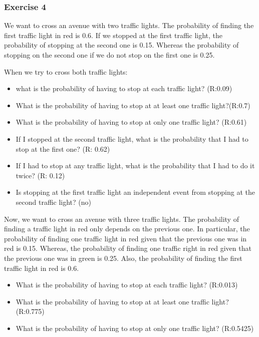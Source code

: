 \documentclass[
]{book}
\providecommand{\tightlist}{%
  \setlength{\itemsep}{0pt}\setlength{\parskip}{0pt}}
\begin{document}
\hypertarget{exercise-4}{%
\subsubsection{Exercise 4}\label{exercise-4}}

We want to cross an avenue with two traffic lights. The probability of finding the first traffic light in red is 0.6. If we stopped at the first traffic light, the probability of stopping at the second one is 0.15. Whereas the probability of stopping on the second one if we do not stop on the first one is 0.25.

When we try to cross both traffic lights:

\begin{itemize}
\tightlist
\item
  what is the probability of having to stop at each traffic light? (R:0.09)
\item
  What is the probability of having to stop at at least one traffic light?(R:0.7)
\item
  What is the probability of having to stop at only one traffic light? (R:0.61)
\item
  If I stopped at the second traffic light, what is the probability that I had to stop at the first one? (R: 0.62)
\item
  If I had to stop at any traffic light, what is the probability that I had to do it twice? (R: 0.12)
\item
  Is stopping at the first traffic light an independent event from stopping at the second traffic light? (no)
\end{itemize}

Now, we want to cross an avenue with three traffic lights. The probability of finding a traffic light in red only depends on the previous one. In particular, the probability of finding one traffic light in red given that the previous one was in red is 0.15. Whereas, the probability of finding one traffic right in red given that the previous one was in green is 0.25. Also, the probability of finding the first traffic light in red is 0.6.

\begin{itemize}
\tightlist
\item
  What is the probability of having to stop at each traffic light? (R:0.013)
\item
  What is the probability of having to stop at at least one traffic light? (R:0.775)
\item
  What is the probability of having to stop at only one traffic light? (R:0.5425)
\end{itemize}
\end{document}
